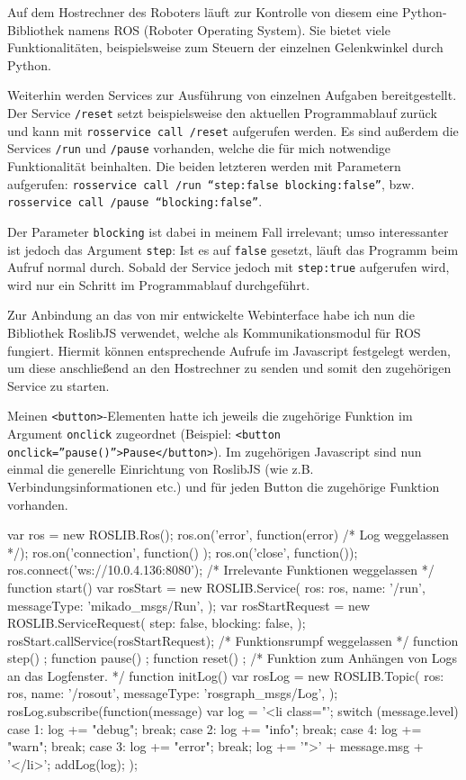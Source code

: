 Auf dem Hostrechner des Roboters läuft zur Kontrolle von diesem eine Python-Bibliothek
namens ROS (Roboter Operating System). Sie bietet viele Funktionalitäten, beispielsweise
zum Steuern der einzelnen Gelenkwinkel durch Python.

Weiterhin werden Services zur Ausführung von einzelnen Aufgaben bereitgestellt.
Der Service \texttt{/reset} setzt beispielsweise den aktuellen Programmablauf
zurück und kann mit \texttt{rosservice call /reset} aufgerufen werden. Es sind
außerdem die Services \texttt{/run} und \texttt{/pause} vorhanden, welche die für
mich notwendige Funktionalität beinhalten. Die beiden letzteren werden mit Parametern
aufgerufen: \texttt{rosservice call /run ``step:false blocking:false''}, bzw.
\texttt{rosservice call /pause ``blocking:false''}.

Der Parameter \texttt{blocking} ist dabei in meinem Fall irrelevant; umso interessanter
ist jedoch das Argument \texttt{step}: Ist es auf \texttt{false} gesetzt, läuft
das Programm beim Aufruf normal durch. Sobald der Service jedoch mit \texttt{step:true}
aufgerufen wird, wird nur ein Schritt im Programmablauf durchgeführt.

Zur Anbindung an das von mir entwickelte Webinterface habe ich nun die Bibliothek
RoslibJS verwendet, welche als Kommunikationsmodul für ROS fungiert. Hiermit können
entsprechende Aufrufe im Javascript festgelegt werden, um diese anschließend an
den Hostrechner zu senden und somit den zugehörigen Service zu starten.

Meinen \texttt{<button>}-Elementen hatte ich jeweils die zugehörige Funktion im
Argument \texttt{onclick} zugeordnet (Beispiel: \texttt{<button onclick=''pause()''>Pause</button>}).
Im zugehörigen Javascript sind nun einmal die generelle Einrichtung von RoslibJS
(wie z.B. Verbindungsinformationen etc.) und für jeden Button die zugehörige Funktion
vorhanden.

\begin{code}[language=javascript, caption={Serviceaufruf durch RoslibJS}]
var ros = new ROSLIB.Ros();
ros.on('error', function(error) {/* Log weggelassen */});
ros.on('connection', function() {});
ros.on('close', function(){});
ros.connect('ws://10.0.4.136:8080');
/* Irrelevante Funktionen weggelassen */
function start() {
	var rosStart = new ROSLIB.Service({
		ros: ros,
		name: '/run',
		messageType: 'mikado_msgs/Run',
	});
	var rosStartRequest = new ROSLIB.ServiceRequest({
		step: false,
		blocking: false,
	});
	rosStart.callService(rosStartRequest);
}
/* Funktionsrumpf weggelassen */
function step() {};
function pause() {};
function reset() {};
/* Funktion zum Anhängen von Logs an das Logfenster. */
function initLog() {
	var rosLog = new ROSLIB.Topic({
		ros: ros,
		name: '/rosout',
		messageType: 'rosgraph_msgs/Log',
	});
	rosLog.subscribe(function(message) {
		var log = '<li class="';
		switch (message.level) {
			case 1:
				log += "debug";
				break;
			case 2:
				log += "info";
				break;
			case 4:
				log += "warn";
				break;
			case 3:
				log += "error";
				break;
		}
		log += '">' + message.msg + '</li>';
		addLog(log);
	});
}
\end{code}

